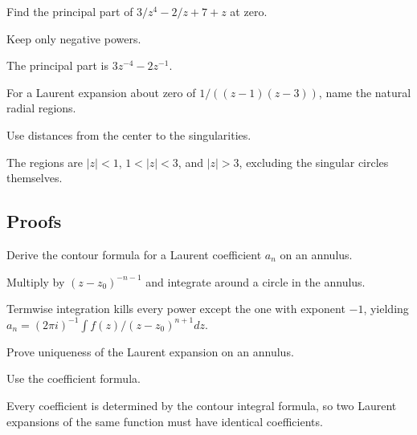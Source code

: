 \begin{exercise}\label{exr:iv08-expand-04}
Find the principal part of \(3/z^4-2/z+7+z\) at zero.
\end{exercise}
\begin{hint}
Keep only negative powers.
\end{hint}
\begin{solution}
The principal part is \(3z^{-4}-2z^{-1}\).
\end{solution}

\begin{exercise}\label{exr:iv08-expand-05}
For a Laurent expansion about zero of \(1/((z-1)(z-3))\), name the natural radial regions.
\end{exercise}
\begin{hint}
Use distances from the center to the singularities.
\end{hint}
\begin{solution}
The regions are \(|z|<1\), \(1<|z|<3\), and \(|z|>3\), excluding the singular circles themselves.
\end{solution}

\subsection*{Proofs}

\begin{exercise}\label{exr:iv08-expand-06}
Derive the contour formula for a Laurent coefficient \(a_n\) on an annulus.
\end{exercise}
\begin{hint}
Multiply by \((z-z_0)^{-n-1}\) and integrate around a circle in the annulus.
\end{hint}
\begin{solution}
Termwise integration kills every power except the one with exponent \(-1\), yielding \(a_n=(2\pi i)^{-1}\int f(z)/(z-z_0)^{n+1}dz\).
\end{solution}

\begin{exercise}[Uniqueness]\label{exr:iv08-expand-07}
Prove uniqueness of the Laurent expansion on an annulus.
\end{exercise}
\begin{hint}
Use the coefficient formula.
\end{hint}
\begin{solution}
Every coefficient is determined by the contour integral formula, so two Laurent expansions of the same function must have identical coefficients.
\end{solution}

